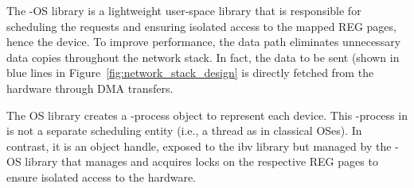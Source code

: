  The \projecttitle{}-OS library is a lightweight user-space library that is responsible for scheduling the \projecttitle{} requests and ensuring isolated access to the mapped REG pages, hence the device. To improve performance, the \projecttitle{} data path eliminates unnecessary data copies throughout the network stack. In fact, the data to be sent (shown in blue lines in Figure~\ref{fig:network_stack_design} is directly fetched from the hardware through DMA transfers. 

The OS library creates a \projecttitle{}-process object to represent each \projecttitle{} device.  This \projecttitle{}-process in \projecttitle{} is not a separate scheduling entity (i.e., a thread as in classical OSes). In contrast, it is an object handle, exposed to the ibv library but managed by the \projecttitle{}-OS library that manages and acquires locks on the respective REG pages to ensure isolated access to the \projecttitle{} hardware.





